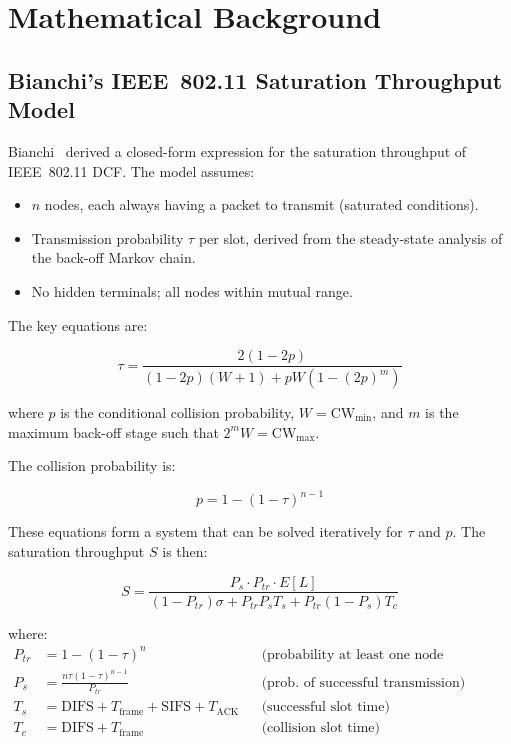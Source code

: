 \chapter{Mathematical Background}
\label{app:math}

\section{Bianchi's IEEE~802.11 Saturation Throughput Model}

Bianchi~\cite{bianchi2000} derived a closed-form expression for the saturation
throughput of IEEE~802.11 DCF. The model assumes:

\begin{itemize}
  \item $n$ nodes, each always having a packet to transmit (saturated conditions).
  \item Transmission probability $\tau$ per slot, derived from the steady-state analysis
    of the back-off Markov chain.
  \item No hidden terminals; all nodes within mutual range.
\end{itemize}

The key equations are:

\begin{equation}
  \tau = \frac{2(1 - 2p)}{(1 - 2p)(W + 1) + pW\!\left(1 - (2p)^m\right)}
  \label{eq:tau}
\end{equation}

where $p$ is the conditional collision probability, $W = \text{CW}_{\min}$, and $m$ is
the maximum back-off stage such that $2^m W = \text{CW}_{\max}$.

The collision probability is:

\begin{equation}
  p = 1 - (1 - \tau)^{n-1}
  \label{eq:collision_prob}
\end{equation}

These equations form a system that can be solved iteratively for $\tau$ and $p$. The
saturation throughput $S$ is then:

\begin{equation}
  S = \frac{P_s \cdot P_{tr} \cdot E[L]}
         {(1 - P_{tr})\sigma + P_{tr}P_s T_s + P_{tr}(1-P_s)T_c}
  \label{eq:saturation}
\end{equation}

where:
\begin{align}
  P_{tr} &= 1 - (1-\tau)^n & &\text{(probability at least one node transmits)} \\
  P_s    &= \frac{n\tau(1-\tau)^{n-1}}{P_{tr}} & &\text{(prob.\ of successful transmission)} \\
  T_s    &= \text{DIFS} + T_{\text{frame}} + \text{SIFS} + T_{\text{ACK}} & &\text{(successful slot time)} \\
  T_c    &= \text{DIFS} + T_{\text{frame}} & &\text{(collision slot time)}
\end{align}


